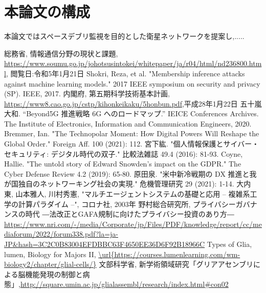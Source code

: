 \section{本論文の構成}
本論文ではスペースデブリ監視を目的とした衛星ネットワークを提案し,.....


\begin{thebibliography}{9}
総務省, 情報通信分野の現状と課題, \url{https://www.soumu.go.jp/johotsusintokei/whitepaper/ja/r04/html/nd236800.html}, 閲覧日:令和5年1月21日
Shokri, Reza, et al. "Membership inference attacks against machine learning models." 2017 IEEE symposium on security and privacy (SP). IEEE, 2017.
内閣府, 第五期科学技術基本計画, \url{https://www8.cao.go.jp/cstp/kihonkeikaku/5honbun.pdf},平成28年1月22日
五十嵐大和. ``Beyond5G 推進戦略 6G へのロードマップ.'' IEICE Conferences Archives. The Institute of Electronics, Information and Communication Engineers, 2020. 
Bremmer, Ian. "The Technopolar Moment: How Digital Powers Will Reshape the Global Order." Foreign Aff. 100 (2021): 112.
宮下紘. "個人情報保護とサイバー・セキュリティ: デジタル時代の双子." 比較法雑誌 49.4 (2016): 81-93.
Coyne, Hallie. "The untold story of Edward Snowden’s impact on the GDPR." The Cyber Defense Review 4.2 (2019): 65-80.
原田泉. "米中新冷戦期の DX 推進と我が国独自のネットワーキング社会の実現." 危機管理研究 29 (2021): 1-14.
大内 東, 山本雅人, 川村秀憲, "マルチエージェントシステムの基礎と応用 -- 複雑系工学の計算パラダイム --", コロナ社, 2003年
野村総合研究所, プライバシーガバナンスの時代 ―法改正とGAFA規制に向けたプライバシー投資のあり方― \url{https://www.nri.com/-/media/Corporate/jp/Files/PDF/knowledge/report/cc/mediaforum/2022/forum338.pdf?la=ja-JP&hash=3C2C0B83004EFDBBC63F4650EE36D6F92B18966C}
Types of Glia, lumen, Biology for Majors II,
\url{\url{https://courses.lumenlearning.com/wm-biology2/chapter/glial-cells/}}
文部科学省, 新学術領域研究「グリアアセンブリによる脳機能発現の制御と病態」,\url{http://square.umin.ac.jp/glialassembl/research/index.html#con02}
\end{thebibliography}







